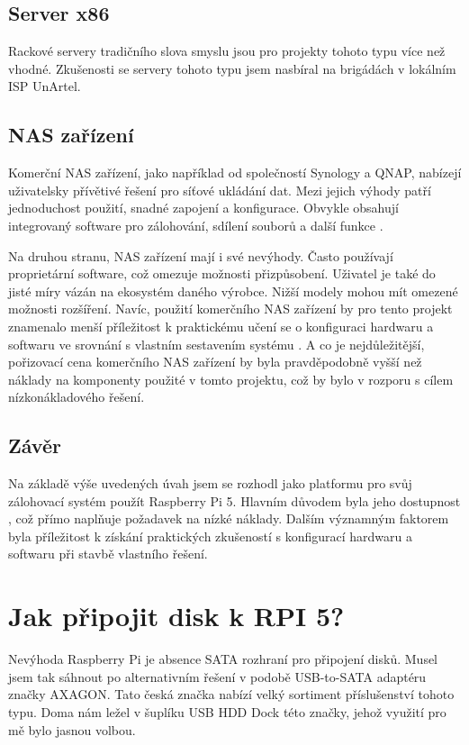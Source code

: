 \documentclass[a4paper,12pt, oneside]{book}
\begin{document}
\subsection{Server x86}

Rackové servery tradičního slova smyslu jsou pro projekty tohoto typu
více než vhodné. Zkušenosti se servery tohoto typu
jsem nasbíral na brigádách v lokálním ISP UnArtel. 

\subsection{NAS zařízení}

Komerční NAS zařízení, jako například od společností Synology a QNAP, nabízejí
uživatelsky přívětivé řešení pro síťové ukládání dat. Mezi jejich výhody patří
jednoduchost použití, snadné zapojení a konfigurace. Obvykle obsahují
integrovaný software pro zálohování, sdílení souborů a další funkce .  

Na druhou stranu, NAS zařízení mají i své nevýhody. Často používají proprietární
software, což omezuje možnosti přizpůsobení. Uživatel je také do jisté míry
vázán na ekosystém daného výrobce. Nižší modely mohou mít omezené možnosti
rozšíření. Navíc, použití komerčního NAS zařízení by pro tento projekt znamenalo
menší příležitost k praktickému učení se o konfiguraci hardwaru a softwaru ve
srovnání s vlastním sestavením systému . A co je nejdůležitější, pořizovací cena
komerčního NAS zařízení by byla pravděpodobně vyšší než náklady na komponenty
použité v tomto projektu, což by bylo v rozporu s cílem nízkonákladového řešení.  

\subsection{Závěr}



Na základě výše uvedených úvah jsem se rozhodl jako platformu pro svůj
zálohovací systém použít Raspberry Pi 5. Hlavním důvodem byla jeho dostupnost
, což přímo naplňuje
požadavek na nízké náklady. Dalším významným faktorem byla příležitost k získání
praktických zkušeností s konfigurací hardwaru a softwaru při stavbě vlastního
řešení.


\section{Jak připojit disk k RPI 5?}

Nevýhoda Raspberry Pi je absence SATA rozhraní pro připojení disků.
Musel jsem tak sáhnout po alternativním řešení v podobě 
USB-to-SATA adaptéru značky AXAGON. Tato česká značka nabízí 
velký sortiment příslušenství tohoto typu. Doma nám ležel v šuplíku
USB HDD Dock této značky, jehož využití pro mě 
bylo jasnou volbou.
\end{document}
